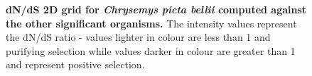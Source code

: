 \documentclass{article}
\begin{document}
\begin{figure}[H]
\centering
{}
\caption{\textbf{dN/dS 2D grid for \textit{Chrysemys picta bellii} computed against the other significant organisms.} The intensity values represent the dN/dS ratio - values lighter in colour are less than 1 and purifying selection while values darker in colour are greater than 1 and represent positive selection.}
\label{sup_fig_20}
\end{figure}
\end{document}

